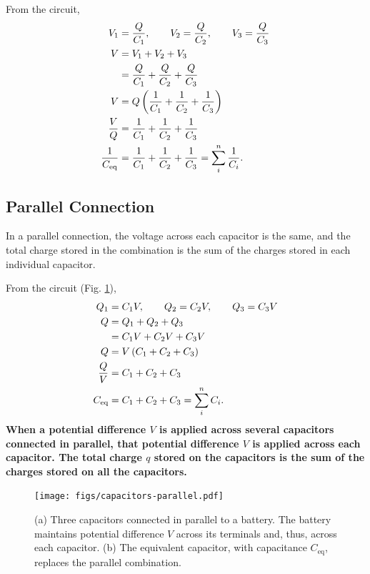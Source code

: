 \documentclass[12pt,b4paper]{article}
\begin{document}
From the circuit,
\begin{align}
    V_1&=\frac{Q}{C_1},\qquad V_2=\frac{Q}{C_2},\qquad V_3=\frac{Q}{C_3}\\
    V&=V_1+V_2+V_3\notag\\
    &=\frac{Q}{C_1}+\frac{Q}{C_2}+\frac{Q}{C_3}\notag\\
    V&=Q\left(\frac{1}{C_1}+\frac{1}{C_2}+\frac{1}{C_3}\right)\notag\\
    \frac{V}{Q}&=\frac{1}{C_1}+\frac{1}{C_2}+\frac{1}{C_3}\notag\\
    \frac{1}{C_\text{eq}}&=\frac{1}{C_1}+\frac{1}{C_2}+\frac{1}{C_3}=\sum_i^n\frac{1}{C_i}.
\end{align}
\subsection{Parallel Connection}
In a parallel connection, the voltage across each capacitor is the same, and the total charge stored in the combination is the sum of the charges stored in each individual capacitor.

From the circuit (Fig. \ref{fig:capacitance-parallel}),
\begin{align}
    Q_1&=C_1V,\qquad Q_2=C_2V,\qquad Q_3=C_3V\\
    Q&=Q_1+Q_2+Q_3\notag\\
    &=C_1V+C_2V+C_3V\notag\\
    Q&=V\left(C_1+C_2+C_3\right)\notag\\
    \frac{Q}{V}&=C_1+C_2+C_3\notag\\
    C_\text{eq}&=C_1+C_2+C_3=\sum_i^n{C_i}.
\end{align}
\textbf{When a potential difference $V$ is applied across several capacitors connected in parallel, that potential difference $V$ is applied across each capacitor. The total charge $q$ stored on the capacitors is the sum of the charges stored on all the capacitors.}
\begin{figure}[H]
    \centering
    \texttt{[image: figs/capacitors-parallel.pdf]}
    \caption{(a) Three capacitors connected in parallel to a battery. The battery maintains potential difference $V$ across its terminals and, thus, across each capacitor. (b) The equivalent capacitor, with capacitance $C_\text{eq}$, replaces the parallel combination.}
    \label{fig:capacitance-parallel}
\end{figure}
\end{document}
